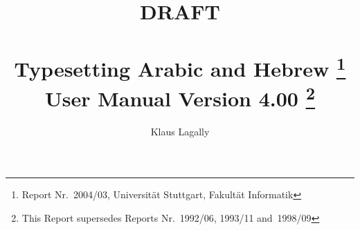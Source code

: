 \documentclass[10pt,titlepage]{report}
\begin{document}

\setarab
\setnash
\quiet

\title {%
\leavevmode
{DRAFT}\\[80mm]
\ArabTeX\\Typesetting Arabic and Hebrew%
\thanks{Report Nr.~2004/03, Universit\"at Stuttgart,
Fakult\"at Informatik}
\\[4mm]
User Manual Version 4.00%
\thanks{This Report supersedes Reports Nr.~1992/06, 1993/11 and~1998/09}}

\author {Klaus Lagally}


\maketitle


\clearpage



\end{document}
